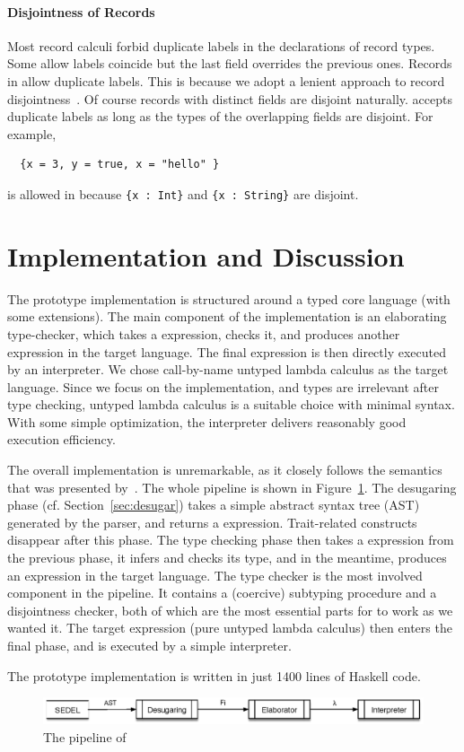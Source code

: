 \paragraph{Disjointness of Records}

Most record calculi forbid duplicate labels in the declarations of record types.
Some allow labels coincide but the last field overrides the previous ones.
Records in \name allow duplicate labels. This is because we adopt a lenient
approach to record disjointness~\cite{alpuimdisjoint}. Of course records with
distinct fields are disjoint naturally. \name accepts duplicate labels as long
as the types of the overlapping fields are disjoint. For example,
\begin{lstlisting}
  {x = 3, y = true, x = "hello" }
\end{lstlisting}
is allowed in \name because \lstinline${x : Int}$ and \lstinline${x : String}$ are
disjoint.

\section{Implementation and Discussion}

The \name prototype implementation is structured around a typed core language
(\bname with some extensions). The main component of the implementation is an
elaborating type-checker, which takes a \bname expression, checks it, and
produces another expression in the target language. The final expression is then
directly executed by an interpreter. We chose call-by-name untyped lambda
calculus as the target language. Since we focus on the implementation, and types
are irrelevant after type checking, untyped lambda calculus is a suitable choice
with minimal syntax. With some simple optimization, the interpreter delivers
reasonably good execution efficiency.

The overall implementation is unremarkable, as it closely follows the semantics
that was presented by~\citet{alpuimdisjoint}. The whole pipeline is shown in
Figure~\ref{fig:pipeline}. The desugaring phase (cf. Section~\ref{sec:desugar})
takes a simple abstract syntax tree (AST) generated by the parser, and returns a
\bname expression. Trait-related constructs disappear after this phase. The
type checking phase then takes a \bname expression from the previous phase, it
infers and checks its type, and in the meantime, produces an expression in the
target language. The type checker is the most involved component in the
pipeline. It contains a (coercive) subtyping procedure and a disjointness
checker, both of which are the most essential parts for \name to work as we
wanted it. The target expression (pure untyped lambda calculus) then enters the
final phase, and is executed by a simple interpreter.

The prototype implementation is written in just 1400 lines of Haskell code.

\begin{figure}
  \centering
  \includegraphics[scale=0.9]{pipeline.eps}
  \caption{The pipeline of \name}
  \label{fig:pipeline}
\end{figure}